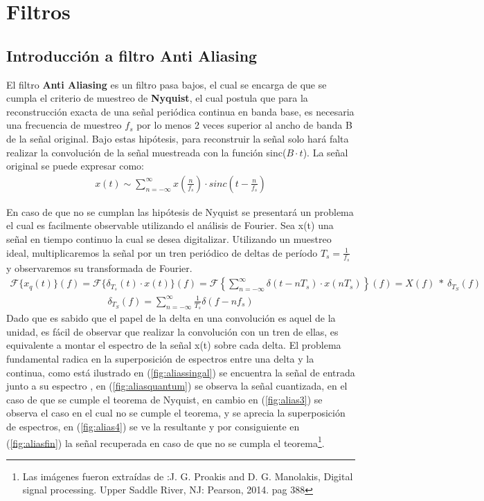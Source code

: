 


\section{Filtros}

\subsection{Introducción a filtro Anti Aliasing}
El filtro \textbf{Anti Aliasing} es un filtro pasa bajos, el cual se encarga de que se cumpla el criterio de muestreo de \textbf{Nyquist}, el cual postula  que para la reconstrucción exacta de una señal periódica continua en banda base, es necesaria una frecuencia de muestreo $f_s$  por lo menos 2 veces superior al ancho de banda B de la señal original. Bajo estas hipótesis, para reconstruir la señal solo hará falta realizar la convolución de la señal muestreada con la función sinc($B\cdot t$).
La señal original se puede expresar como:
\begin{align}
	x\left( t \right) \sim \sum_{n=-\infty}^{\infty} x\left( \frac{n}{f_s} \right) \cdot sinc \left( t-\frac{n}{f_s} \right)
\end{align}


En caso de que no se cumplan las hipótesis de Nyquist se presentará un problema el cual es facilmente observable utilizando el análisis de Fourier.
Sea x(t) una señal en tiempo continuo la cual se desea digitalizar. Utilizando un muestreo ideal, multiplicaremos la señal por un tren periódico de deltas de período $T_s = \frac{1}{f_s}$
y observaremos su transformada de Fourier.
\begin{align}
	\mathcal{F} \{x_q(t) \} (f) =\mathcal{F} \{ \delta_{T_s} (t) \cdot x(t) \} (f)=\mathcal{F} \left\lbrace \sum_{n=-\infty}^{\infty} \delta(t-nT_s) \cdot x(nT_s)\right\rbrace (f)= X(f)\  *  \ \delta_{T_S}(f)
\end{align}
\begin{align}
\delta_{T_S}(f)= \sum_{n=-\infty}^{\infty} \frac{1}{T_s} \delta(f-nf_s)
\end{align}
Dado que es sabido que el papel de la delta en una convolución es aquel de la unidad, es fácil de observar que realizar la convolución con un tren de ellas, es equivalente a montar el espectro de la señal x(t) sobre cada delta. El problema fundamental radica en la superposición de espectros entre una delta y la continua, como está ilustrado en (\ref{fig:aliassingal}) se encuentra la señal de entrada junto a su espectro , en (\ref{fig:aliasquantum}) se observa la señal cuantizada, en el caso de que se cumple el teorema de Nyquist, en cambio en (\ref{fig:alias3}) se observa el caso en el cual no se cumple el teorema, y se aprecia la superposición de espectros, en (\ref{fig:alias4}) se ve la resultante y por consiguiente en (\ref{fig:aliasfin}) la señal recuperada en caso de que no se cumpla el teorema\footnote{Las imágenes fueron extraídas de :J. G. Proakis and D. G. Manolakis, Digital signal processing. Upper Saddle River, NJ: Pearson, 2014. pag 388}.

